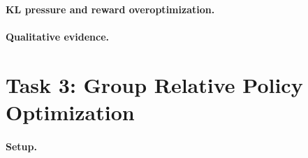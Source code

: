 \documentclass{article}
\begin{document}

\paragraph{KL pressure and reward overoptimization.}

%


\paragraph{Qualitative evidence.}






\section{Task 3: Group Relative Policy Optimization}

\paragraph{Setup.}

%
%
\end{document}
